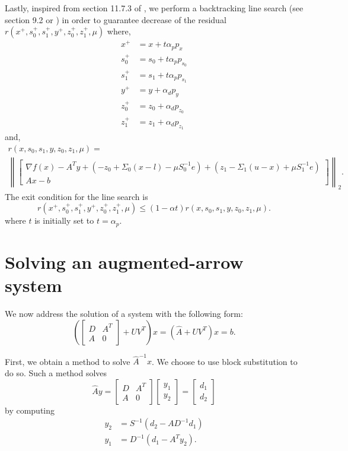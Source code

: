 \documentclass{article}
\begin{document}
Lastly, inspired from section 11.7.3 of \cite{BL04}, 
    we perform a backtracking line search (see section 9.2 or \cite{BL04})
    in order to guarantee decrease of the residual
    $r(x^+, s_0^+, s_1^+, y^+, z_0^+, z_1^+, \mu)$ where,
    \begin{align*}
    x^+ &= x + t \alpha_p p_x \\
    s_0^+ &= s_0+t \alpha_p p_{s_0} \\
    s_1^+ &= s_1+t \alpha_p p_{s_1} \\
    y^+ &= y +\alpha_d p_y \\
    z_0^+ &= z_0 + \alpha_d p_{z_0} \\
    z_1^+ &= z_1+\alpha_d p_{z_1} 
    \end{align*}
    and,
\begin{multline}
    r(x, s_0, s_1, y, z_0, z_1, \mu) = \\
\left\|
\begin{bmatrix}
    \nabla f(x) - A^T y + (-z_0 + \Sigma_0 (x - l) - \mu S_0^{-1} e) 
                        + (z_1 - \Sigma_1 (u - x) + \mu S_1^{-1} e) \\
    A x - b
\end{bmatrix}\right\|_2.
\end{multline}
The exit condition for the line search is 
    \begin{equation} r(x^+, s_0^+, s_1^+, y^+, z_0^+, z_1^+, \mu) \le
    (1-\alpha t) r(x, s_0, s_1, y, z_0, z_1, \mu).
    \end{equation}
where $t$ is initially set to $t = \alpha_p$.

\section{Solving an augmented-arrow system}
We now address the solution of a system with the following form:
\begin{equation}
    \left(\begin{bmatrix} D & A^T \\ A & 0 \end{bmatrix} + UV^T\right)x = 
    (\hat{A} + UV^T)x = b. \label{eq:main}
\end{equation}

First, we obtain a method to solve $\hat{A}^{-1} x$.
We choose to use block substitution to do so. 
Such a method solves 
\begin{equation}
    \hat{A}y = 
    \begin{bmatrix} D & A^T \\ A & 0 \end{bmatrix}
    \begin{bmatrix} y_1 \\ y_2 \end{bmatrix} = 
    \begin{bmatrix} d_1 \\ d_2 \end{bmatrix}
\end{equation}
by computing
\begin{align}
    y_2 &= S^{-1} (d_2 - A D^{-1} d_1) \\
    y_1 &= D^{-1} ( d_1 - A^T y_2).
\end{align}
\end{document}
